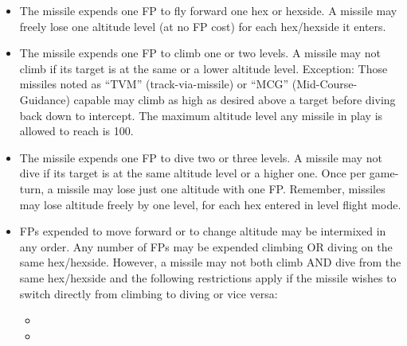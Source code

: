 
\begin{itemize}

    \item {} The missile expends one FP to fly forward one hex or hexside. A missile may freely lose one altitude level (at no FP cost) for each hex/hexside it enters.

    \item {} The missile expends one FP to climb one or two levels. A missile may not climb if its target is at the same or a lower altitude level. Exception: Those missiles noted as “TVM” (track-via-missile) or “MCG” (Mid-Course-Guidance) capable may climb as high as desired above a target before diving back down to intercept. The maximum altitude level any missile in play is allowed to reach is 100.

    \item {} The missile expends one FP to dive two or three levels. A missile may not dive if its target is at the same altitude level or a higher one. Once per game-turn, a missile may lose just one altitude with one FP. Remember, missiles may lose altitude freely by one level, for each hex entered in level flight mode.

    \item {} FPs expended to move forward or to change altitude may be intermixed in any order. Any number of FPs may be expended climbing OR diving on the same hex/hexside. However, a missile may not both climb AND dive from the same hex/hexside and the following restrictions apply if the missile wishes to switch directly from climbing to diving or vice versa:

    \begin{itemize}

        \item {}
        
        \item {}


\end{itemize}
\end{itemize}
